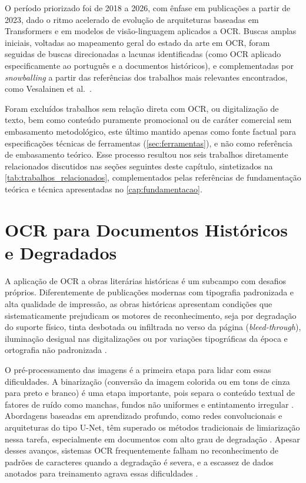 \documentclass[noabntexcite,oneside]{ufsc-thesis-rn46-2019}
\begin{document}
O período priorizado foi de 2018 a 2026, com ênfase em publicações a partir de 2023,
dado o ritmo acelerado de evolução de arquiteturas baseadas em Transformers e em modelos
de visão-linguagem aplicados a OCR. Buscas amplas iniciais, voltadas ao mapeamento geral do
estado da arte em OCR, foram seguidas de buscas direcionadas a lacunas identificadas
(como OCR aplicado especificamente ao português e a documentos históricos), e
complementadas por \textit{snowballing} a partir das referências dos trabalhos mais
relevantes encontrados, como Vesalainen et al.\ \cite{vesalainen2025}.

Foram excluídos trabalhos
sem relação direta com OCR, ou digitalização de texto, bem como conteúdo puramente
promocional ou de caráter comercial sem embasamento metodológico, este último mantido
apenas como fonte factual para especificações técnicas de ferramentas (\autoref{sec:ferramentas}), e não
como referência de embasamento teórico. Esse processo resultou nos seis trabalhos
diretamente relacionados discutidos nas seções seguintes deste capítulo, sintetizados na
\autoref{tab:trabalhos_relacionados}, complementados pelas referências de
fundamentação teórica e técnica apresentadas no \autoref{cap:fundamentacao}.

\section{OCR para Documentos Históricos e Degradados}
\label{sec:ocr_historico}

A aplicação de OCR a obras literárias históricas é um subcampo com desafios próprios. Diferentemente de
publicações modernas com tipografia padronizada e alta qualidade de impressão, as obras
históricas apresentam condições que sistematicamente prejudicam os motores de
reconhecimento, seja por degradação do suporte físico, tinta desbotada ou infiltrada no
verso da página (\textit{bleed-through}), iluminação desigual nas digitalizações ou por
variações tipográficas da época e ortografia não padronizada \cite{lombardi2020}.

O pré-processamento das imagens é a primeira etapa para lidar com essas dificuldades. A
binarização (conversão da imagem colorida ou em tons de cinza para preto e branco) é
uma etapa importante, pois separa o conteúdo textual de fatores de
ruído como manchas, fundos não uniformes e entintamento irregular \cite{lombardi2020}.
Abordagens baseadas em aprendizado profundo, como redes convolucionais e arquiteturas do
tipo U-Net, têm superado os métodos tradicionais de limiarização nessa tarefa,
especialmente em documentos com alto grau de degradação \cite{anvari2021}. Apesar desses
avanços, sistemas OCR frequentemente falham no reconhecimento de padrões de caracteres
quando a degradação é severa, e a escassez de dados anotados para treinamento agrava
essas dificuldades \cite{lombardi2020}.
\end{document}
